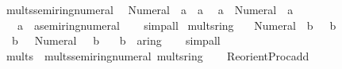 \begin{isabellebody}
\isamarkupfalse%
\ mult{\isacharunderscore}{\kern0pt}{}s{\isacharunderscore}{\kern0pt}semiring{\isacharunderscore}{\kern0pt}numeral{\isacharcolon}{\kern0pt}\isanewline
\ \ {\isachardoublequoteopen}Numeral{}\ {\isacharasterisk}{\kern0pt}\ a\ {\isacharequal}{\kern0pt}\ a{\isachardoublequoteclose}\isanewline
\ \ {\isachardoublequoteopen}a\ {\isacharasterisk}{\kern0pt}\ Numeral{}\ {\isacharequal}{\kern0pt}\ a{\isachardoublequoteclose}\isanewline
\ \ \ a\ {\isacharcolon}{\kern0pt}{\isacharcolon}{\kern0pt}\ {\isachardoublequoteopen}{\isacharprime}{\kern0pt}a{\isacharcolon}{\kern0pt}{\isacharcolon}{\kern0pt}semiring{\isacharunderscore}{\kern0pt}numeral{\isachardoublequoteclose}\isanewline
%
\isadelimproof
\ \ %
\endisadelimproof
%
\isatagproof
{}\isamarkupfalse%
\ simp{\isacharunderscore}{\kern0pt}all%
\endisatagproof
{\isafoldproof}%
%
\isadelimproof
\isanewline
%
\endisadelimproof
\isanewline
{}\isamarkupfalse%
\ mult{\isacharunderscore}{\kern0pt}{}s{\isacharunderscore}{\kern0pt}ring{\isacharunderscore}{\kern0pt}{}{\isacharcolon}{\kern0pt}\isanewline
\ \ {\isachardoublequoteopen}{\isacharminus}{\kern0pt}\ Numeral{}\ {\isacharasterisk}{\kern0pt}\ b\ {\isacharequal}{\kern0pt}\ {\isacharminus}{\kern0pt}\ b{\isachardoublequoteclose}\isanewline
\ \ {\isachardoublequoteopen}b\ {\isacharasterisk}{\kern0pt}\ {\isacharminus}{\kern0pt}\ Numeral{}\ {\isacharequal}{\kern0pt}\ {\isacharminus}{\kern0pt}\ b{\isachardoublequoteclose}\isanewline
\ \ \ b\ {\isacharcolon}{\kern0pt}{\isacharcolon}{\kern0pt}\ {\isachardoublequoteopen}{\isacharprime}{\kern0pt}a{\isacharcolon}{\kern0pt}{\isacharcolon}{\kern0pt}ring{\isacharunderscore}{\kern0pt}{}{\isachardoublequoteclose}\isanewline
%
\isadelimproof
\ \ %
\endisadelimproof
%
\isatagproof
{}\isamarkupfalse%
\ simp{\isacharunderscore}{\kern0pt}all%
\endisatagproof
{\isafoldproof}%
%
\isadelimproof
\isanewline
%
\endisadelimproof
\isanewline
{}\isamarkupfalse%
\ mult{\isacharunderscore}{\kern0pt}{}s\ {\isacharequal}{\kern0pt}\ mult{\isacharunderscore}{\kern0pt}{}s{\isacharunderscore}{\kern0pt}semiring{\isacharunderscore}{\kern0pt}numeral\ mult{\isacharunderscore}{\kern0pt}{}s{\isacharunderscore}{\kern0pt}ring{\isacharunderscore}{\kern0pt}{}\isanewline
%
\isadelimML
\isanewline
%
\endisadelimML
%
\isatagML
{}\isamarkupfalse%
\ {\isacartoucheopen}\isanewline
\ \ Reorient{\isacharunderscore}{\kern0pt}Proc{\isachardot}{\kern0pt}add\isanewline

\end{isabellebody}
